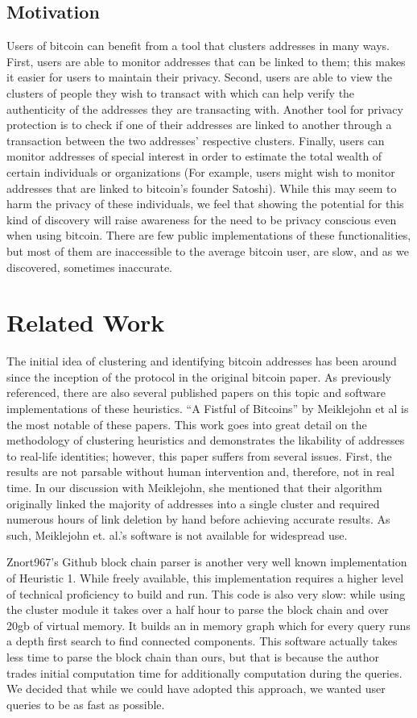 \documentclass[10pt, letterpaper, twocolumn, twoside]{article}
\begin{document}
\subsection{Motivation}
Users of bitcoin can benefit from a tool that clusters addresses in many ways. First, users are able to monitor addresses that can be linked to them; this makes it easier for users to maintain their privacy. Second, users are able to view the clusters of people they wish to transact with which can help verify the authenticity of the addresses they are transacting with. Another tool for privacy protection is to check if one of their addresses are linked to another through a transaction between the two addresses' respective clusters. Finally, users can monitor addresses of special interest in order to estimate the total wealth of certain individuals or organizations (For example, users might wish to monitor addresses that are linked to bitcoin's founder Satoshi). While this may seem to harm the privacy of these individuals, we feel that showing the potential for this kind of discovery will raise awareness for the need to be privacy conscious even when using bitcoin. There are few public implementations of these functionalities, but most of them are inaccessible to the average bitcoin user, are slow, and as we discovered, sometimes inaccurate.


\section{Related Work}
\label{related}
The initial idea of clustering and identifying bitcoin addresses has been around since the inception of the protocol in the original bitcoin paper. As previously referenced, there are also several published papers on this topic and software implementations of these heuristics. ``A Fistful of Bitcoins'' by Meiklejohn et al\cite{fistfull} is the most notable of these papers. This work goes into great detail on the methodology of clustering heuristics and demonstrates the likability of addresses to real-life identities; however, this paper suffers from several issues. First, the results are not parsable without human intervention and, therefore, not in real time. In our discussion with Meiklejohn, she mentioned that their algorithm originally linked the majority of addresses into a single cluster and required numerous hours of link deletion by hand before achieving accurate results. As such, Meiklejohn et. al.'s software is not available for widespread use.

Znort967's Github block chain parser is another very well known implementation of Heuristic 1\cite{znort}. While freely available, this implementation requires a higher level of technical proficiency to build and run. This code is also very slow: while using the cluster module it takes over a half hour to parse the block chain and over 20gb of virtual memory. It builds an in memory graph which for every query runs a depth first search to find connected components. This software actually takes less time to parse the block chain than ours, but that is because the author trades initial computation time for additionally computation during the queries. We decided that while we could have adopted this approach, we wanted user queries to be as fast as possible.
\end{document}
